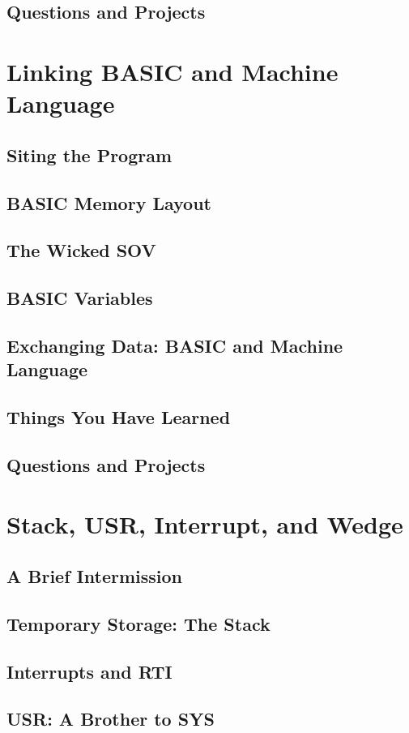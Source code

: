 \documentclass[11pt,a4paper,titlepage]{memoir}
\begin{document}
\section{Questions and Projects}

\chapter{Linking BASIC and Machine Language}
\section{Siting the Program}
\section{BASIC Memory Layout}
\section{The Wicked SOV}
\section{BASIC Variables}
\section{Exchanging Data: BASIC and Machine Language}
\section{Things You Have Learned}
\section{Questions and Projects}
\chapter{Stack, USR, Interrupt, and Wedge}
\section{A Brief Intermission}
\section{Temporary Storage: The Stack}
\section{Interrupts and RTI}
\section{USR: A Brother to SYS}
\end{document}
